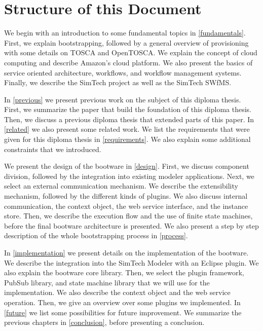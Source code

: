 \section{Structure of this Document}

We begin with an introduction to some fundamental topics in \autoref{fundamentals}.
First, we explain bootstrapping, followed by a general overview of provisioning with some details on TOSCA and OpenTOSCA.
We explain the concept of cloud computing and describe Amazon's cloud platform.
We also present the basics of service oriented architecture, workflows, and workflow management systems.
Finally, we describe the SimTech project as well as the SimTech SWfMS.

In \autoref{previous} we present previous work on the subject of this diploma thesis.
First, we summarize the paper that build the foundation of this diploma thesis.
Then, we discuss a previous diploma thesis that extended parts of this paper.
In \autoref{related} we also present some related work.
We list the requirements that were given for this diploma thesis in \autoref{requirements}.
We also explain some additional constraints that we introduced.

We present the design of the bootware in \autoref{design}.
First, we discuss component division, followed by the integration into existing modeler applications.
Next, we select an external communication mechanism.
We describe the extensibility mechanism, followed by the different kinds of plugins.
We also discuss internal communication, the context object, the web service interface, and the instance store.
Then, we describe the execution flow and the use of finite state machines, before the final bootware architecture is presented.
We also present a step by step description of the whole bootstrapping process in \autoref{process}.

In \autoref{implementation} we present details on the implementation of the bootware.
We describe the integration into the SimTech Modeler with an Eclipse plugin.
We also explain the bootware core library.
Then, we select the plugin framework, PubSub library, and state machine library that we will use for the implementation.
We also describe the context object and the web service operation.
Then, we give an overview over some plugins we implemented.
In \autoref{future} we list some possibilities for future improvement.
We summarize the previous chapters in \autoref{conclusion}, before presenting a conclusion.
